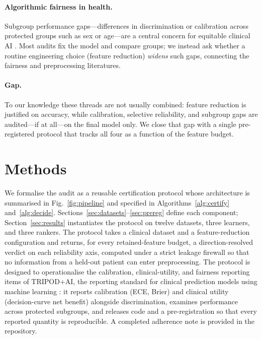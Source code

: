 \documentclass[fleqn,10pt]{wlscirep}
\begin{document}
\paragraph{Algorithmic fairness in health.}
Subgroup performance gaps---differences in discrimination or calibration across protected
groups such as sex or age---are a central concern for equitable clinical AI
\cite{obermeyer2019dissecting,rajkomar2018ensuring}. Most audits fix the model and compare
groups; we instead ask whether a routine engineering choice
(feature reduction) \emph{widens} such gaps, connecting the fairness and preprocessing
literatures.

\paragraph{Gap.} To our knowledge these threads are not usually combined: feature reduction
is justified on accuracy, while calibration, selective reliability, and subgroup gaps are
audited---if at all---on the final model only. We close that gap with a single pre-registered
protocol that tracks all four as a function of the feature budget.

\section{Methods}
\label{sec:methods}

We formalise the audit as a reusable certification protocol whose architecture is summarised in
Fig.~\ref{fig:pipeline} and specified in Algorithms~\ref{alg:certify} and~\ref{alg:decide}.
Sections~\ref{sec:datasets}--\ref{sec:prereg} define each component; Section~\ref{sec:results}
instantiates the protocol on twelve datasets, three learners, and three rankers. The protocol takes a
clinical dataset and a feature-reduction configuration and returns, for every retained-feature budget,
a direction-resolved verdict on each reliability axis, computed under a strict leakage firewall so
that no information from a held-out patient can enter preprocessing. The protocol is designed to
operationalise the calibration, clinical-utility, and fairness reporting items of TRIPOD+AI, the
reporting standard for clinical prediction models using machine learning \cite{collins2024tripod}:
it reports calibration (ECE, Brier) and clinical utility (decision-curve net benefit) alongside
discrimination, examines performance across protected subgroups, and releases code and a
pre-registration so that every reported quantity is reproducible. A completed adherence note is
provided in the repository.
\end{document}
